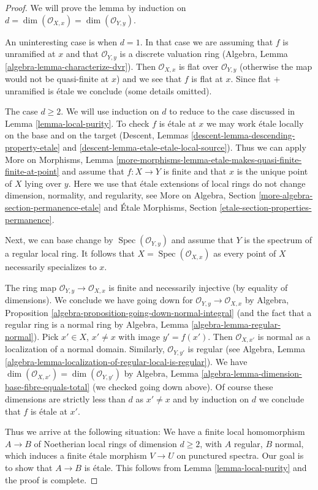 \documentclass{stacks-project}
\theoremstyle{plain}
\theoremstyle{definition}
\theoremstyle{remark}
\numberwithin{equation}{subsection}
\def\Spec{\mathop{\mathrm{Spec}}}
\begin{document}
\begin{proof}
We will prove the lemma by induction on
$d = \dim(\mathcal{O}_{X, x}) = \dim(\mathcal{O}_{Y, y})$.

\medskip\noindent
An uninteresting case is when $d = 1$.
In that case we are assuming that $f$ is unramified at $x$
and that $\mathcal{O}_{Y, y}$ is a discrete valuation ring
(Algebra, Lemma \ref{algebra-lemma-characterize-dvr}).
Then $\mathcal{O}_{X, x}$ is flat over $\mathcal{O}_{Y, y}$
(otherwise the map would not be quasi-finite at $x$)
and we see that $f$ is flat at $x$. Since flat $+$
unramified is \'etale we conclude (some details omitted).

\medskip\noindent
The case $d \geq 2$. We will use induction on $d$ to reduce
to the case discussed in Lemma \ref{lemma-local-purity}.
To check $f$ is \'etale at $x$ we may work \'etale locally
on the base and on the target
(Descent, Lemmas \ref{descent-lemma-descending-property-etale} and
\ref{descent-lemma-etale-etale-local-source}).
Thus we can apply More on Morphisms, Lemma
\ref{more-morphisms-lemma-etale-makes-quasi-finite-finite-at-point}
and assume that $f : X \to Y$ is finite and that $x$ is the unique
point of $X$ lying over $y$. Here we use that \'etale extensions of
local rings do not change dimension, normality, and regularity, see
More on Algebra, Section \ref{more-algebra-section-permanence-etale}
and
\'Etale Morphisms, Section \ref{etale-section-properties-permanence}.

\medskip\noindent
Next, we can base change by $\Spec(\mathcal{O}_{Y, y})$
and assume that $Y$ is the spectrum of a regular local ring.
It follows that $X = \Spec(\mathcal{O}_{X, x})$ as
every point of $X$ necessarily specializes to $x$.

\medskip\noindent
The ring map $\mathcal{O}_{Y, y} \to \mathcal{O}_{X, x}$ is
finite and necessarily injective (by equality of dimensions).
We conclude we have going down for
$\mathcal{O}_{Y, y} \to \mathcal{O}_{X, x}$ by
Algebra, Proposition \ref{algebra-proposition-going-down-normal-integral}
(and the fact that a regular ring is a normal ring by
Algebra, Lemma \ref{algebra-lemma-regular-normal}).
Pick $x' \in X$, $x' \not = x$ with image $y' = f(x')$.
Then $\mathcal{O}_{X, x'}$ is normal as a localization
of a normal domain. Similarly, $\mathcal{O}_{Y, y'}$ is
regular (see Algebra, Lemma
\ref{algebra-lemma-localization-of-regular-local-is-regular}).
We have $\dim(\mathcal{O}_{X, x'}) = \dim(\mathcal{O}_{Y, y'})$ by
Algebra, Lemma \ref{algebra-lemma-dimension-base-fibre-equals-total}
(we checked going down above).
Of course these dimensions are strictly less than $d$ as $x' \not = x$
and by induction on $d$ we conclude that $f$ is \'etale at $x'$.

\medskip\noindent
Thus we arrive at the following situation: We have a finite
local homomorphism $A \to B$ of Noetherian local rings
of dimension $d \geq 2$, with $A$ regular, $B$ normal, which
induces a finite \'etale morphism $V \to U$ on punctured spectra.
Our goal is to show that $A \to B$ is \'etale.
This follows from Lemma \ref{lemma-local-purity}
and the proof is complete.
\end{proof}
\end{document}
